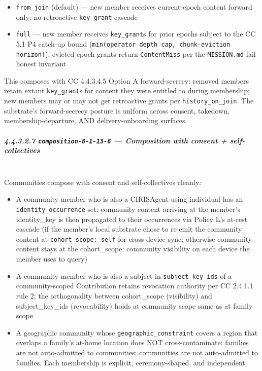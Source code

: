 \documentclass[11pt]{article}
\begin{document}
\begin{itemize}\setlength\itemsep{0pt}
\item \texttt{from\_join} (default) — new member receives current-epoch content forward only; no retroactive \texttt{key\_grant} cascade
\item \texttt{full} — new member receives \texttt{key\_grant}s for prior epochs subject to the CC 5.1 P4 catch-up bound (\texttt{min(operator depth cap, chunk-eviction horizon)}); evicted-epoch grants return \texttt{ContentMiss} per the \texttt{MISSION.md} fail-honest invariant
\end{itemize}


This composes with CC 4.4.3.4.5 Option A forward-secrecy: removed members retain extant \texttt{key\_grant}s for content they were entitled to during membership; new members may or may not get retroactive grants per \texttt{history\_on\_join}. The substrate's forward-secrecy posture is uniform across consent, takedown, membership-departure, AND delivery-onboarding surfaces.


\subparagraph{4.4.3.2.7 \texttt{composition-8-1-13-6} — Composition with consent + self-collectives}\mbox{}\\


Communities compose with consent and self-collectives cleanly:


\begin{itemize}\setlength\itemsep{0pt}
\item A community member who is also a CIRISAgent-using individual has an \texttt{identity\_occurrence} set; community content arriving at the member's identity\_key is then propagated to their occurrences via Policy L's at-rest cascade (if the member's local substrate chose to re-emit the community content at \texttt{cohort\_scope: self} for cross-device sync; otherwise community content stays at the cohort\_scope: community visibility on each device the member uses to query)
\item A community member who is also a subject in \texttt{subject\_key\_ids} of a community-scoped Contribution retains revocation authority per CC 2.4.1.1 rule 2; the orthogonality between cohort\_scope (visibility) and subject\_key\_ids (revocability) holds at community scope same as at family scope
\item A geographic community whose \texttt{geographic\_constraint} covers a region that overlaps a family's at-home location does NOT cross-contaminate: families are not auto-admitted to communities; communities are not auto-admitted to families. Each membership is explicit, ceremony-shaped, and independent.
\end{itemize}
\end{document}
